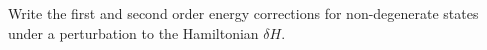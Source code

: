 

\vspace*{\fill}
\centering

Write the first and second order energy corrections for non-degenerate states under a perturbation to the Hamiltonian $\delta H$.

\centering
\vspace*{\fill}

